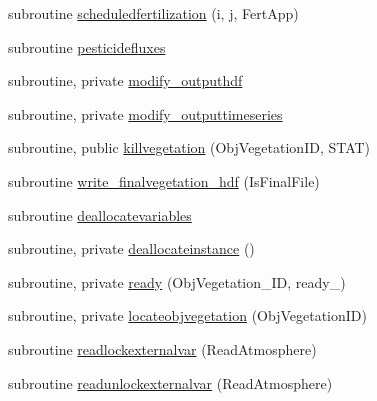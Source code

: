 \begin{DoxyCompactItemize}
\item 
subroutine \mbox{\hyperlink{namespacemodulevegetation_a61c84b3c83334d731a2e537c7f0373fc}{scheduledfertilization}} (i, j, Fert\+App)
\item 
subroutine \mbox{\hyperlink{namespacemodulevegetation_af6d8868a0a498022d072c484bbfc5f73}{pesticidefluxes}}
\item 
subroutine, private \mbox{\hyperlink{namespacemodulevegetation_ae3c35b12a954295511c0439076c44694}{modify\+\_\+outputhdf}}
\item 
subroutine, private \mbox{\hyperlink{namespacemodulevegetation_aca579929724e1ba027a5dedcca09f4f3}{modify\+\_\+outputtimeseries}}
\item 
subroutine, public \mbox{\hyperlink{namespacemodulevegetation_abd79c5ff82c66aadb0dd041cf80540b8}{killvegetation}} (Obj\+Vegetation\+ID, S\+T\+AT)
\item 
subroutine \mbox{\hyperlink{namespacemodulevegetation_ad1ed23055b336a8f8253483f2289121b}{write\+\_\+finalvegetation\+\_\+hdf}} (Is\+Final\+File)
\item 
subroutine \mbox{\hyperlink{namespacemodulevegetation_a4208f430811c220efd414cd21312b73d}{deallocatevariables}}
\item 
subroutine, private \mbox{\hyperlink{namespacemodulevegetation_a6be2722d95215f594c5f964837e1e955}{deallocateinstance}} ()
\item 
subroutine, private \mbox{\hyperlink{namespacemodulevegetation_a7bff2743f33908bdf727831d101dc37a}{ready}} (Obj\+Vegetation\+\_\+\+ID, ready\+\_\+)
\item 
subroutine, private \mbox{\hyperlink{namespacemodulevegetation_ac457b656dd70c067c1609578542d0d16}{locateobjvegetation}} (Obj\+Vegetation\+ID)
\item 
subroutine \mbox{\hyperlink{namespacemodulevegetation_a81039144c85fe53d59983283da9998a3}{readlockexternalvar}} (Read\+Atmosphere)
\item 
subroutine \mbox{\hyperlink{namespacemodulevegetation_adc5d72657ff85d4a70bd5b3345b65563}{readunlockexternalvar}} (Read\+Atmosphere)
\end{DoxyCompactItemize}

